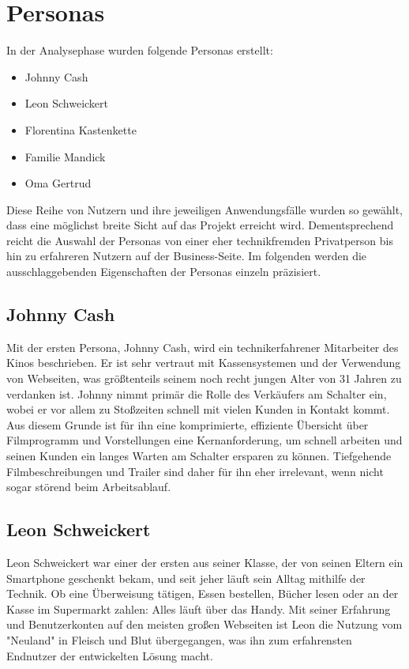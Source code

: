 \section{Personas}

In der Analysephase wurden folgende Personas erstellt:
\begin{itemize}
\item Johnny Cash
\item Leon Schweickert
\item Florentina Kastenkette
\item Familie Mandick
\item Oma Gertrud
\end{itemize}

Diese Reihe von Nutzern und ihre jeweiligen Anwendungsfälle wurden so gewählt, dass eine möglichst breite Sicht auf das Projekt erreicht wird.
Dementsprechend reicht die Auswahl der Personas von einer eher technikfremden Privatperson bis hin zu erfahreren Nutzern auf der Business-Seite.
Im folgenden werden die ausschlaggebenden Eigenschaften der Personas einzeln präzisiert.


\subsection{Johnny Cash}
Mit der ersten Persona, Johnny Cash, wird ein technikerfahrener Mitarbeiter des Kinos beschrieben.
Er ist sehr vertraut mit Kassensystemen und der Verwendung von Webseiten, was größtenteils seinem noch recht jungen Alter von 31 Jahren zu verdanken ist.
Johnny nimmt primär die Rolle des Verkäufers am Schalter ein, wobei er vor allem zu Stoßzeiten schnell mit vielen Kunden in Kontakt kommt.
Aus diesem Grunde ist für ihn eine komprimierte, effiziente Übersicht über Filmprogramm und Vorstellungen eine Kernanforderung, um schnell arbeiten und seinen Kunden ein langes Warten am Schalter ersparen zu können.
Tiefgehende Filmbeschreibungen und Trailer sind daher für ihn eher irrelevant, wenn nicht sogar störend beim Arbeitsablauf.

\subsection{Leon Schweickert}
Leon Schweickert war einer der ersten aus seiner Klasse, der von seinen Eltern ein Smartphone geschenkt bekam, und seit jeher läuft sein Alltag mithilfe der Technik.
Ob eine Überweisung tätigen, Essen bestellen, Bücher lesen oder an der Kasse im Supermarkt zahlen: Alles läuft über das Handy.
Mit seiner Erfahrung und Benutzerkonten auf den meisten großen Webseiten ist Leon die Nutzung vom "Neuland" in Fleisch und Blut übergegangen, was ihn zum erfahrensten Endnutzer der entwickelten Lösung macht.

